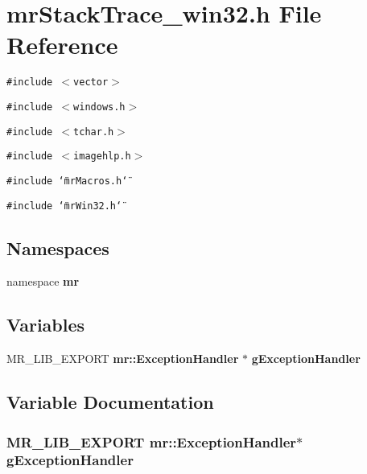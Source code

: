 \section{mr\-Stack\-Trace\_\-win32.h File Reference}
\label{mrStackTrace__win32_8h}
{\tt \#include $<$vector$>$}\par
{\tt \#include $<$windows.h$>$}\par
{\tt \#include $<$tchar.h$>$}\par
{\tt \#include $<$imagehlp.h$>$}\par
{\tt \#include \char`\"{}mr\-Macros.h\char`\"{}}\par
{\tt \#include \char`\"{}mr\-Win32.h\char`\"{}}\par
\subsection*{Namespaces}
\begin{CompactItemize}
\item 
namespace {\bf mr}
\end{CompactItemize}
\subsection*{Variables}
\begin{CompactItemize}
\item 
MR\_\-LIB\_\-EXPORT {\bf mr::Exception\-Handler} $\ast$ {\bf g\-Exception\-Handler}
\end{CompactItemize}


\subsection{Variable Documentation}
\subsubsection{\setlength{\rightskip}{0pt plus 5cm}MR\_\-LIB\_\-EXPORT {\bf mr::Exception\-Handler}$\ast$ {\bf g\-Exception\-Handler}}\label{mrStackTrace__win32_8h_a0}


